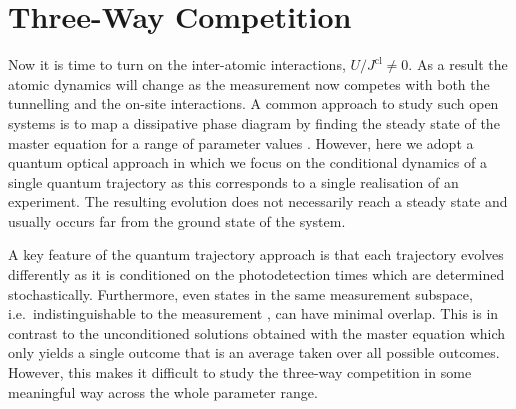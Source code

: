 \section{Three-Way Competition}

Now it is time to turn on the inter-atomic interactions,
$U/J^\mathrm{cl} \ne 0$. As a result the atomic dynamics will change
as the measurement now competes with both the tunnelling and the
on-site interactions. A common approach to study such open systems is
to map a dissipative phase diagram by finding the steady state of the
master equation for a range of parameter values
\cite{kessler2012}. However, here we adopt a quantum optical approach
in which we focus on the conditional dynamics of a single quantum
trajectory as this corresponds to a single realisation of an
experiment. The resulting evolution does not necessarily reach a
steady state and usually occurs far from the ground state of the
system.

A key feature of the quantum trajectory approach is that each
trajectory evolves differently as it is conditioned on the
photodetection times which are determined stochastically. Furthermore,
even states in the same measurement subspace, i.e.~indistinguishable
to the measurement , can have minimal overlap. This is in contrast to
the unconditioned solutions obtained with the master equation which
only yields a single outcome that is an average taken over all
possible outcomes. However, this makes it difficult to study the
three-way competition in some meaningful way across the whole
parameter range.

